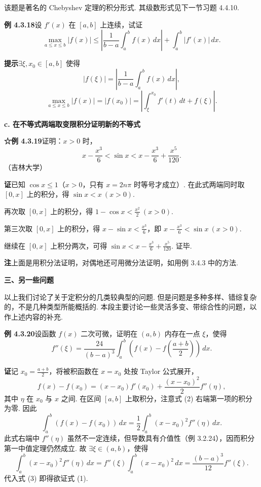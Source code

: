 \documentclass[UTF8, 12pt, fontset=fandol, oneside]{ctexart}
\begin{document}
该题是著名的 Chebyshev 定理的积分形式. 其级数形式见下一节习题 4.4.10.

\noindent\textbf{例 4.3.18}\quad 设 $f'(x)$ 在 $[a,b]$ 上连续，试证
\[
\max_{a\le x\le b}|f(x)|
\le\left|\frac1{b-a}\int_a^b f(x)\,dx\right|
+\int_a^b|f'(x)|\,dx.
\]

\noindent\textbf{提示}\quad $\exists\xi,x_0\in[a,b]$ 使得
\[
|f(\xi)|=\left|\frac1{b-a}\int_a^b f(x)\,dx\right|,
\]
\[
\max_{a\le x\le b}|f(x)|
=|f(x_0)|
=\left|\int_\xi^{x_0} f'(t)\,dt+f(\xi)\right|.
\]

\noindent\textbf{c. 在不等式两端取变限积分证明新的不等式}

\noindent\textbf{☆例 4.3.19}\quad 证明：$x>0$ 时，
\[
x-\frac{x^3}{6}<\sin x<x-\frac{x^3}{6}+\frac{x^5}{120}.
\]
（吉林大学）

\noindent\textbf{证}\quad 已知 $\cos x\le1$（$x>0$，只有 $x=2n\pi$ 时等号才成立）. 在此式两端同时取 $[0,x]$ 上的积分，得 $\sin x<x\ (x>0)$.

再次取 $[0,x]$ 上的积分，得 $1-\cos x<\frac{x^2}{2}\ (x>0)$.

第三次取 $[0,x]$ 上的积分，得 $x-\sin x<\frac{x^3}{6}$，即 $x-\frac{x^3}{6}<\sin x\ (x>0)$.

继续在 $[0,x]$ 上积分两次，可得 $\sin x<x-\frac{x^3}{6}+\frac{x^5}{120}$. 证毕.

\noindent\textbf{注}\quad 上面是用积分法证明，对偶地还可用微分法证明，如用例 3.4.3 中的方法.

\noindent\textbf{三、另一些问题}

以上我们讨论了关于定积分的几类较典型的问题. 但是问题是多种多样、错综复杂的，不是几种类型所能概括的. 本段主要讨论一些灵活多变、带综合性的问题，以作上述内容的补充.

\noindent\textbf{例 4.3.20}\quad 设函数 $f(x)$ 二次可微，证明在 $(a,b)$ 内存在一点 $\xi$，使得
\[
f''(\xi)=\frac{24}{(b-a)^3}\int_a^b\left(f(x)-f\left(\frac{a+b}{2}\right)\right)\,dx.
\tag{1}
\]

\noindent\textbf{证}\quad 记 $x_0=\frac{a+b}{2}$，将被积函数在 $x=x_0$ 处按 Taylor 公式展开，
\[
f(x)-f(x_0)=(x-x_0)f'(x_0)+\frac{(x-x_0)^2}{2}f''(\eta),
\tag{2}
\]
其中 $\eta$ 在 $x_0$ 与 $x$ 之间. 在区间 $[a,b]$ 上取积分，注意式 (2) 右端第一项的积分为零. 因此
\[
\int_a^b(f(x)-f(x_0))\,dx
=\frac12\int_a^b(x-x_0)^2f''(\eta)\,dx.
\tag{3}
\]
此式右端中 $f''(\eta)$ 虽然不一定连续，但导数具有介值性（例 3.2.24），因而积分第一中值定理仍然成立. 故 $\exists\xi\in(a,b)$，使得
\[
\int_a^b(x-x_0)^2f''(\eta)\,dx
=f''(\xi)\int_a^b(x-x_0)^2\,dx
=\frac{(b-a)^3}{12}f''(\xi).
\]
代入式 (3) 即得欲证式 (1).
\end{document}
